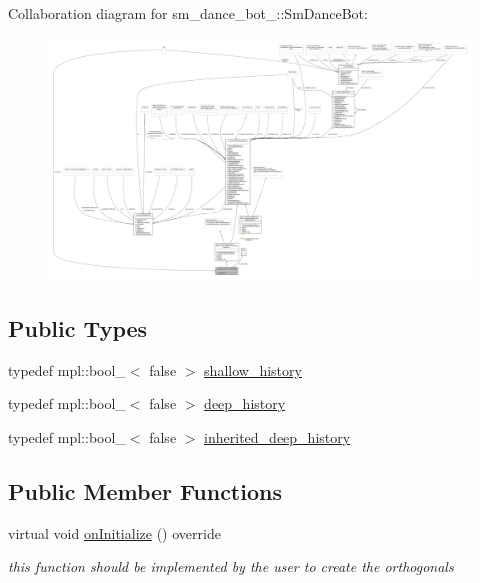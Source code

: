 Collaboration diagram for sm\+\_\+dance\+\_\+bot\+\_\+:\+:Sm\+Dance\+Bot\+:
\nopagebreak
\begin{figure}[H]
\begin{center}
\leavevmode
\includegraphics[width=350pt]{structsm__dance__bot__3_1_1SmDanceBot__coll__graph}
\end{center}
\end{figure}
\subsection*{Public Types}
\begin{DoxyCompactItemize}
\item 
typedef mpl\+::bool\+\_\+$<$ false $>$ \hyperlink{structsm__dance__bot__3_1_1SmDanceBot_a29f018e7d804cee842794b6ad022ea54}{shallow\+\_\+history}
\item 
typedef mpl\+::bool\+\_\+$<$ false $>$ \hyperlink{structsm__dance__bot__3_1_1SmDanceBot_af4725d37e5f9649b7ca07382435e7287}{deep\+\_\+history}
\item 
typedef mpl\+::bool\+\_\+$<$ false $>$ \hyperlink{structsm__dance__bot__3_1_1SmDanceBot_aea2a361bde569e0997d9f31214beee60}{inherited\+\_\+deep\+\_\+history}
\end{DoxyCompactItemize}
\subsection*{Public Member Functions}
\begin{DoxyCompactItemize}
\item 
virtual void \hyperlink{structsm__dance__bot__3_1_1SmDanceBot_a8b63f9de89a8eeb6032bcca67269edd1}{on\+Initialize} () override
\begin{DoxyCompactList}\small\item\em this function should be implemented by the user to create the orthogonals \end{DoxyCompactList}\end{DoxyCompactItemize}

